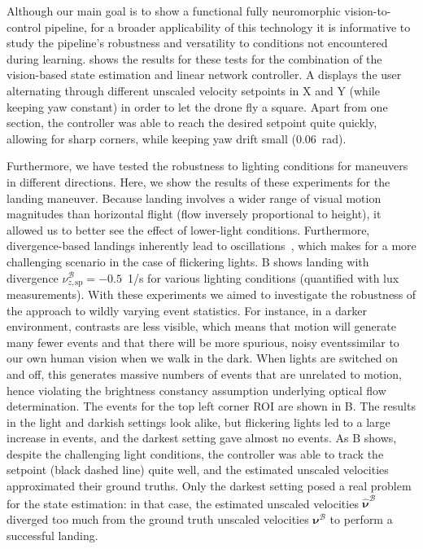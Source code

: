 Although our main goal is to show a functional fully neuromorphic vision-to-control pipeline, for a broader applicability of this technology it is informative to study the pipeline's robustness and versatility to conditions not encountered during learning.  shows the results for these tests for the combination of the vision-based state estimation and linear network controller. A displays the user alternating through different unscaled velocity setpoints in X and Y (while keeping yaw constant) in order to let the drone fly a square. Apart from one section, the controller was able to reach the desired setpoint quite quickly, allowing for sharp corners, while keeping yaw drift small (0.06~rad).

Furthermore, we have tested the robustness to lighting conditions for maneuvers in different directions. Here, we show the results of these experiments for the landing maneuver. Because landing involves a wider range of visual motion magnitudes than horizontal flight (flow inversely proportional to height), it allowed us to better see the effect of lower-light conditions. Furthermore, divergence-based landings inherently lead to oscillations~\cite{decroon2016monocular}, which makes for a more challenging scenario in the case of flickering lights. B shows landing with divergence $\nu^\mathcal{B}_{z,\mathrm{sp}}=-0.5$~1/s for various lighting conditions (quantified with lux measurements). With these experiments we aimed to investigate the robustness of the approach to wildly varying event statistics. For instance, in a darker environment, contrasts are less visible, which means that motion will generate many fewer events and that there will be more spurious, noisy events\textemdash similar to our own human vision when we walk in the dark. When lights are switched on and off, this generates massive numbers of events that are unrelated to motion, hence violating the brightness constancy assumption underlying optical flow determination. The events for the top left corner ROI are shown in B. The results in the light and darkish settings look alike, but flickering lights led to a large increase in events, and the darkest setting gave almost no events. As B shows, despite the challenging light conditions, the controller was able to track the setpoint (black dashed line) quite well, and the estimated unscaled velocities approximated their ground truths. Only the darkest setting posed a real problem for the state estimation: in that case, the estimated unscaled velocities $\boldsymbol{\hat{\nu}}^\mathcal{B}$ diverged too much from the ground truth unscaled velocities $\boldsymbol{{\nu}}^\mathcal{B}$ to perform a successful landing. %

